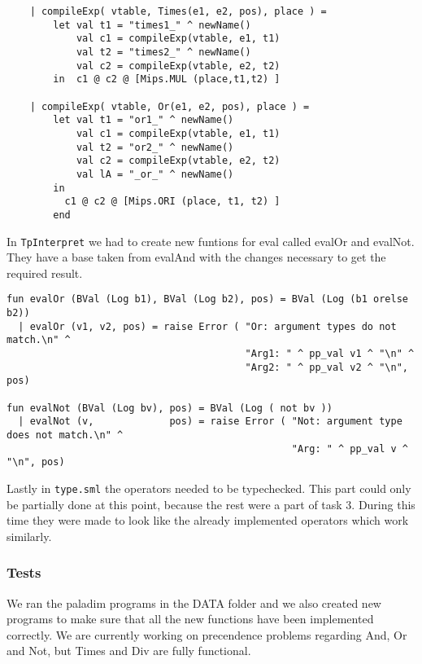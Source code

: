 \documentclass[11pt]{article}
\begin{document}
\begin{lstlisting}
    | compileExp( vtable, Times(e1, e2, pos), place ) =
        let val t1 = "times1_" ^ newName()
            val c1 = compileExp(vtable, e1, t1)
            val t2 = "times2_" ^ newName()
            val c2 = compileExp(vtable, e2, t2)
        in  c1 @ c2 @ [Mips.MUL (place,t1,t2) ]
        
    | compileExp( vtable, Or(e1, e2, pos), place ) =
        let val t1 = "or1_" ^ newName()
            val c1 = compileExp(vtable, e1, t1)
            val t2 = "or2_" ^ newName()
            val c2 = compileExp(vtable, e2, t2)
            val lA = "_or_" ^ newName()
        in
          c1 @ c2 @ [Mips.ORI (place, t1, t2) ]
        end
\end{lstlisting}        

In {\tt TpInterpret} we had to create new funtions for eval called evalOr and evalNot. They have a base taken from evalAnd with the changes necessary to get the required result.

\begin{lstlisting}
fun evalOr (BVal (Log b1), BVal (Log b2), pos) = BVal (Log (b1 orelse b2))
  | evalOr (v1, v2, pos) = raise Error ( "Or: argument types do not match.\n" ^
                                         "Arg1: " ^ pp_val v1 ^ "\n" ^
                                         "Arg2: " ^ pp_val v2 ^ "\n", pos)
                                         
fun evalNot (BVal (Log bv), pos) = BVal (Log ( not bv ))
  | evalNot (v,             pos) = raise Error ( "Not: argument type does not match.\n" ^
                                                 "Arg: " ^ pp_val v ^ "\n", pos)
\end{lstlisting}

Lastly in {\tt type.sml} the operators needed to be typechecked. This part could only be partially done at this point, because the rest were a part of task 3. During this time they were made to look like the already implemented operators which work similarly.

\subsubsection{Tests}
We ran the paladim programs in the DATA folder and we also created new programs to make sure that all the new functions have been implemented correctly. We are currently working on precendence problems regarding And, Or and Not, but Times and Div are fully functional.
\end{document}
